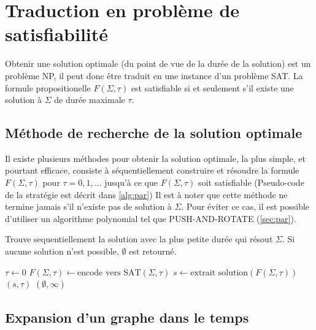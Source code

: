 \documentclass[french, 12pt, letterpaper]{article}
\theoremstyle{definition}
\theoremstyle{proposition}
\theoremstyle{example}
\begin{document}
    \newpage
    \section{Traduction en problème de satisfiabilité}

    Obtenir une solution optimale (du point de vue de la durée de la solution) est un problème NP, il peut donc être traduit en une instance
    d'un problème SAT. La formule propositionelle $F(\Sigma, \tau)$ est satisfiable si et seulement s'il existe une solution à $\Sigma$
    de durée maximale $\tau$.

    \subsection{Méthode de recherche de la solution optimale}
    \label{sec:methiter}

    Il existe plusieurs méthodes pour obtenir la solution optimale, la plus simple, et pourtant efficace, consiste à séquentiellement construire
    et résoudre la formule $F(\Sigma, \tau)$ pour $\tau = 0, 1, \ldots$ jusqu'à ce que $F(\Sigma, \tau)$ soit satisfiable 
    (Pseudo-code de la stratégie est décrit dans \ref{alg:par})
    Il est à noter que cette méthode ne termine jamais s'il n'existe pas de solution à $\Sigma$. Pour éviter ce cas, il est possible 
    d'utiliser un algorithme polynomial tel que PUSH-AND-ROTATE \cite{WILDEPAR} (\ref{sec:par}).

    \begin{algorithm}
        \caption{Trouve sequentiellement la solution avec la plus petite durée qui résout $\Sigma$. 
        Si aucune solution n'est possible, $\emptyset$ est retourné.}
        \begin{algorithmic}
            \label{alg:par}
                \STATE $\tau \leftarrow 0$
                \LOOP
                    \STATE $F(\Sigma, \tau) \leftarrow \text{encode vers SAT}(\Sigma, \tau)$
                        \STATE $s \leftarrow \text{extrait solution}(F(\Sigma, \tau))$
                        \RETURN $( s, \tau )$ 
                    \ENDIF
                \ENDLOOP
            \ELSE
                \RETURN $( \emptyset, \infty )$ 
            \ENDIF
        \end{algorithmic}
    \end{algorithm}
        
    \subsection{Expansion d'un graphe dans le temps}
\end{document}
